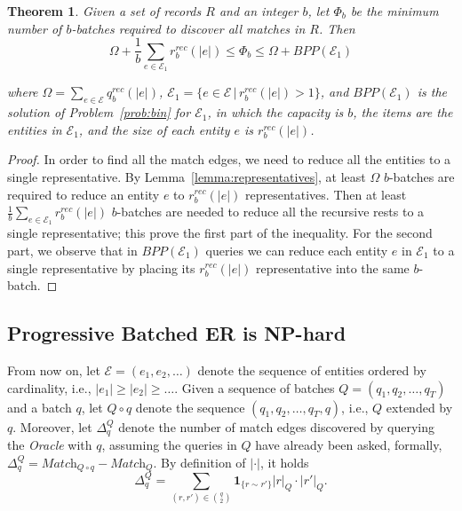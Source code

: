 \documentclass[sigconf, nonacm]{acmart}
\newcommand{\oracle}{\textit{Oracle}\xspace}
\newcommand{\match}{\textit{Match}\xspace}
\newtheorem{theorem}{Theorem}[section]
\begin{document}
\begin{theorem}\label{th:query_min}
    Given a set of records $R$ and an integer $b$, let $\Phi_{b}$ be the minimum number of $b$-batches required to discover all matches in $R$. Then 
    \begin{equation}\label{eq:phi_b}
    \Omega + \frac{1}{b}\sum_{e\in\mathcal{E}_1} r^{rec}_b(|e|)\leq \Phi_b\leq \Omega + BPP(\mathcal{E}_1)
    \end{equation}
    
    where $\Omega = \sum_{e\in\mathcal{E}} q^{rec}_b(|e|)$, $\mathcal{E}_1 =\{e\in\mathcal{E} \, | \, r^{rec}_b(|e|)>1\}$, and $ BPP(\mathcal{E}_1)$ is the solution of Problem~\ref{prob:bin} for $\mathcal{E}_1$, in which the capacity is $b$, the items are the entities in $\mathcal{E}_1$, and the size of each entity $e$ is $r^{rec}_b(|e|)$.
\end{theorem}
\begin{proof}
    In order to find all the match edges, we need to reduce all the entities to a single representative. 
    By Lemma~\ref{lemma:representatives}, at least $\Omega$ $b$-batches are required to reduce an entity $e$ to $r^{rec}_b(|e|)$ representatives. 
    Then at least $\frac{1}{b}\sum_{e\in\mathcal{E}_1}r^{rec}_b(|e|)$ $b$-batches are needed to reduce all the recursive rests to a single representative; this prove the first part of the inequality. 
    For the second part, we observe that in $BPP(\mathcal{E}_1)$ queries we can reduce each entity $e$ in $\mathcal{E}_1$ to a single representative by placing its $r^{rec}_b(|e|)$ representative into the same $b$-batch.
\end{proof}



\subsection{Progressive Batched ER is NP-hard}\label{sub:PBER_NP-hard}

From now on, let $\mathcal{E} = (e_1, e_2,\ldots)$ denote the sequence of entities ordered by cardinality, i.e., $|e_1|\geq |e_2| \geq\ldots$. 
Given a sequence of batches $Q = (q_1,q_2,\ldots,q_T)$ and a batch $q$, let $Q\circ q$ denote the sequence $(q_1,q_2,\ldots,q_T, q)$, i.e., $Q$ extended by $q$. 
Moreover, let $\Delta_q^Q$ denote the number of match edges discovered by querying the \oracle with $q$, assuming the queries in $Q$ have already been asked, formally, $\Delta_q^Q = \match_{Q\circ q} - \match_Q$. 
By definition of $|\cdot|$, it holds
\begin{equation}\label{eq:Delta_q}
    \Delta^Q_q  = \sum_{(r,r')\in \binom{q}{2}} \mathbf{1}_{\{r\sim r'\}}|r|_Q\cdot |r'|_Q.
\end{equation}
\end{document}

